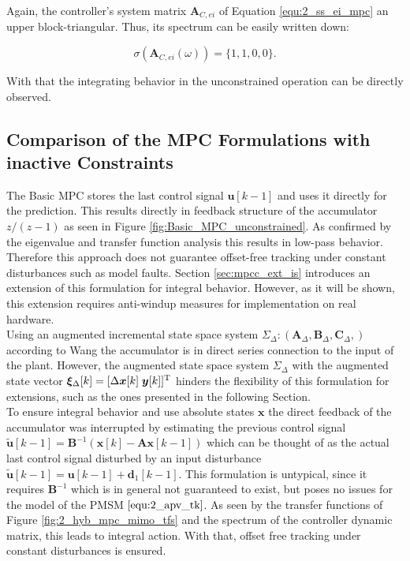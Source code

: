 Again, the controller's system matrix $\bm{A}_{C,ei}$ of Equation \eqref{equ:2_ss_ei_mpc} an upper block-triangular. Thus, its spectrum can be easily written down:

\[
\sigma \left( \bm{A}_{C,ei} \left(\omega\right) \right) = \{1, 1, 0, 0\}.
\]

With that the integrating behavior in the unconstrained operation can be directly observed.

\subsection{Comparison of the MPC Formulations with inactive Constraints}
The Basic MPC stores the last control signal $\bm{u}[k-1]$ and uses it directly for the prediction. This results directly in feedback structure of the accumulator $z/(z-1)$ as seen in Figure \ref{fig:Basic_MPC_unconstrained}. As confirmed by the eigenvalue and transfer function analysis this results in low-pass behavior. Therefore this approach does not guarantee offset-free tracking under constant disturbances such as model faults. Section \ref{sec:mpcc_ext_is} introduces an extension of this formulation for integral behavior. However, as it will be shown, this extension requires anti-windup measures for implementation on real hardware.\\
Using an augmented incremental state space system  $\Sigma_\Delta: \left(\bm{A}_\Delta, \bm{B}_\Delta, \bm{C}_\Delta,\right)$ according to Wang \cite{mpcWang} the accumulator is in direct series connection to the input of the plant. However, the augmented state space system $\Sigma_\Delta$ with the augmented state vector ${\bm{\xi}_{\Delta}[k]} = [\Delta {\bm{x}}[k]\; \bm{y}[k]]^{\mathrm{T}}$ hinders the flexibility of this formulation for extensions, such as the ones presented in the following Section.\\
To ensure integral behavior and use absolute states $\bm{x}$ the direct feedback of the accumulator was interrupted by estimating the previous control signal $\tilde{\bm{u}}[k-1] = \bm{B}^{-1}\left(\bm{x}[k] - \bm{A}\bm{x}[k-1] \right)$ which can be thought of as the actual last control signal disturbed by an input disturbance $\tilde{\bm{u}}[k-1]  = \bm{u} [k-1] + \bm{d}_1[k-1]$. This formulation is untypical, since it requires $\bm{B}^{-1}$ which is in general not guaranteed to exist, but poses no issues for the model of the PMSM $\eqref{equ:2_apv_tk}$. As seen by the transfer functions of Figure \ref{fig:2_hyb_mpc_mimo_tfs} and the spectrum of the controller dynamic matrix, this leads to integral action. With that, offset free tracking under constant disturbances is ensured.\\

